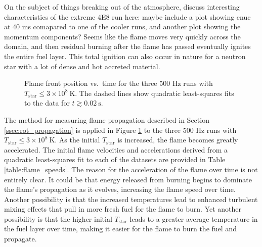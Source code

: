 \documentclass[preprint,times,tighten]{aastex63}
\begin{document}
{\color{red} On the subject of things breaking out of the atmosphere, discuss interesting characteristics of the extreme 4E8 run here: maybe include a plot showing enuc at 40 ms comapared to one of the cooler runs, and another plot showing the momentum components? Seems like the flame moves very quickly across the domain, and then residual burning after the flame has passed eventually ignites the entire fuel layer. This total ignition can also occur in nature for a neutron star with a lot of dense and hot accreted material.}

\begin{figure}[t]
	\centering
	\caption{\label{fig:flame_speeds_2} Flame front position vs.\ time for the three 500 Hz runs with
		$T_{\mathrm{star}} \leq 3 \times 10^8~\mathrm{K}$. The dashed lines show quadratic least-squares fits to the data
		for $t \gtrsim 0.02~\mathrm{s}$.}
\end{figure}

The method for measuring flame propagation described in Section \ref{ssec:rot_propagation} is applied in Figure \ref{fig:flame_speeds_2} to the three 500 Hz runs with $T_{\mathrm{star}} \leq 3 \times 10^8~\mathrm{K}$. As the initial $T_{\mathrm{star}}$ is increased, the flame becomes greatly accelerated. The initial flame velocities and accelerations derived from a quadratic least-squares fit to each of the datasets are provided in Table \ref{table:flame_speeds}. The reason for the acceleration of the flame over time is not entirely clear. It could be that energy released from burning begins to dominate the flame's propagation as it evolves, increasing the flame speed over time. Another possibility is that the increased temperatures lead to enhanced turbulent mixing effects that pull in more fresh fuel for the flame to burn. Yet another possibility is that the higher initial $T_{\mathrm{star}}$ leads to a greater average temperature in the fuel layer over time, making it easier for the flame to burn the fuel and propagate.
\end{document}
